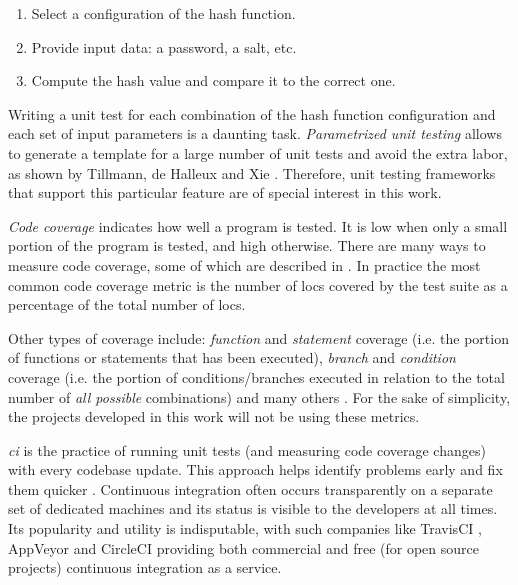 \begin{enumerate}
    \item Select a configuration of the hash function.
    \item Provide input data: a password, a salt, etc.
    \item Compute the hash value and compare it to the correct one.
   \end{enumerate}

Writing a unit test for each combination of the hash function configuration and each set of input parameters is a daunting task. \emph{Parametrized unit testing} allows to generate a template for a large number of unit tests and avoid the extra labor, as shown by Tillmann, de Halleux and Xie \cite{tillmann:2010:parametrized-unit-tests-rock}. Therefore, unit testing frameworks that support this particular feature are of special interest in this work.

\emph{Code coverage} indicates how well a program is tested. It is low when only a small portion of the program is tested, and high otherwise. There are many ways to measure code coverage, some of which are described in \cite{elberzhager:2012:reducing-effort}. In practice the most common code coverage metric is the number of \glspl{loc} covered by the test suite as a percentage of the total number of \glspl{loc}.

Other types of coverage include: \emph{function} and \emph{statement} coverage (i.e. the portion of functions or statements that has been executed), \emph{branch} and \emph{condition} coverage (i.e. the portion of conditions/branches executed in relation to the total number of \emph{all possible} combinations) and many others \cite{Astels:2003:TDD:864016}. For the sake of simplicity, the projects developed in this work will not be using these metrics.

\emph{\Gls{ci}} is the practice of running unit tests (and measuring code coverage changes) with every codebase update. This approach helps identify problems early and fix them quicker \cite{williams:2010:unit-tests-rock}. Continuous integration often occurs transparently on a separate set of dedicated machines and its status is visible to the developers at all times. Its popularity and utility is indisputable, with such companies like TravisCI \cite{travis:2017:homepage}, AppVeyor \cite{appveyor:2017:homepage} and CircleCI \cite{circleci:2017:homepage} providing both commercial and free (for open source projects) continuous integration as a service.
